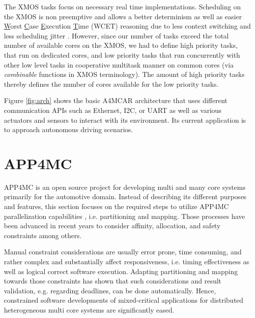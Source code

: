 \documentclass [a4paper,final,conference,10pt]{IDAACS}
\begin{document}
The XMOS tasks focus on necessary real time implementations. Scheduling on the XMOS is non preemptive and allows a better determinism as well as easier \underline{W}orst \underline{C}ase \underline{E}xecution \underline{T}ime (WCET) reasoning due to less context switching and less scheduling jitter \cite{xmos}. However, since our number of tasks exceed the total number of available cores on the XMOS, we had to define high priority tasks, that run on dedicated cores, and low priority tasks that run concurrently with other low level tasks in cooperative multitask manner on common cores (via \textit{combinable} functions in XMOS terminology). The amount of high priority tasks thereby defines the number of cores available for the low priority tasks. 

Figure \ref{fig:arch} shows the basic A4MCAR architecture that uses different communication APIs such as Ethernet, I2C, or UART as well as various actuators and sensors to interact with its environment. Its current application is to approach autonomous driving scenarios.

\section{APP4MC}
\label{sec:app4mc}
APP4MC is an open source project for developing multi and many core systems primarily for the automotive domain. Instead of describing its different purposes and features, this section focuses on the required steps to utilize APP4MC parallelization capabilities \cite{ICPDSSE}, i.e. partitioning and mapping. Those processes have been advanced in recent years to consider affinity, allocation, and safety constraints among others. 

Manual constraint considerations are usually error prone, time consuming, and rather complex and substantially affect responsiveness, i.e. timing effectiveness as well as logical correct software execution. Adapting partitioning and mapping towards those constraints has shown that such considerations and result validation, e.g. regarding deadlines, can be done automatically. Hence, constrained software developments of mixed-critical applications for distributed heterogeneous multi core systems are significantly eased.%
\end{document}
